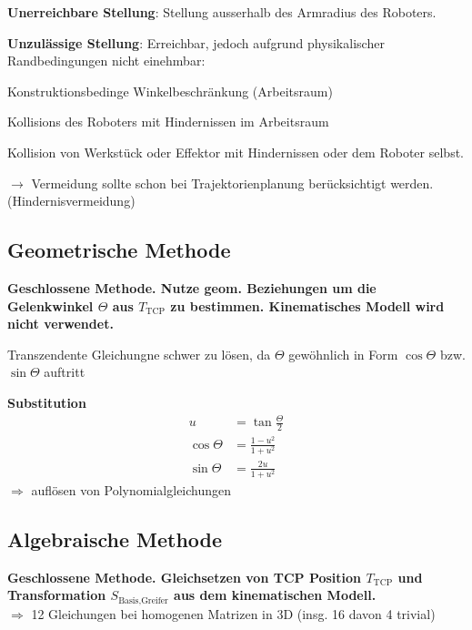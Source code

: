 \begin{compactitem}
    \item \textbf{Unerreichbare Stellung}: Stellung ausserhalb des Armradius des Roboters.
    \item \textbf{Unzulässige Stellung}: Erreichbar, jedoch aufgrund physikalischer Randbedingungen
    nicht einehmbar:
    \begin{compactitem}
        \item Konstruktionsbedinge Winkelbeschränkung (Arbeitsraum)
        \item Kollisions des Roboters mit Hindernissen im Arbeitsraum
        \item Kollision von Werkstück oder Effektor mit Hindernissen oder dem Roboter selbst.
    \end{compactitem}
    \item $\rightarrow$ Vermeidung sollte schon bei Trajektorienplanung berücksichtigt werden.
    (Hindernisvermeidung)
\end{compactitem}

\subsection{Geometrische Methode}
\textbf{Geschlossene Methode. Nutze geom. Beziehungen um die Gelenkwinkel $\Theta$ aus $T_{\text{TCP}}$
zu bestimmen. Kinematisches Modell wird nicht verwendet.}

Transzendente Gleichungne schwer zu lösen, da $\Theta$ gewöhnlich in Form $\cos\Theta$ bzw.
$\sin\Theta$ auftritt

\textbf{Substitution}
\begin{align}
    u &= \tan\frac{\Theta}{2} \\
    \cos\Theta &= \frac{1-u^2}{1+u^2}\\
    \sin\Theta &= \frac{2u}{1+u^2}
\end{align}
$\Rightarrow$ auflösen von Polynomialgleichungen

\subsection{Algebraische Methode}
\textbf{Geschlossene Methode. Gleichsetzen von TCP Position $T_{\text{TCP}}$ und Transformation
$S_{\text{Basis,Greifer}}$ aus dem kinematischen Modell.} \\
$\Rightarrow$ 12 Gleichungen bei homogenen Matrizen in 3D (insg. 16 davon 4 trivial)

